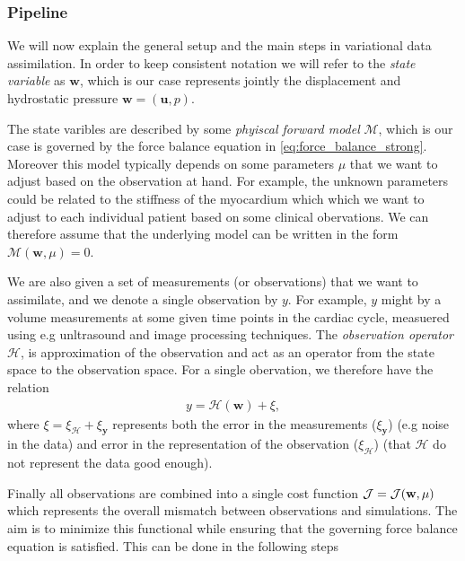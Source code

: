 \subsubsection{Pipeline}
\label{sec:data_assimilation_pipeline}

We will now explain the general setup and the main steps in variational data
assimilation. In order to keep consistent notation we will refer to
the \emph{state variable} as $\mathbf{w}$, which is our case
represents jointly the displacement and hydrostatic pressure
$\mathbf{w}=(\mathbf{u}, p)$.

The state varibles are described by some \emph{phyiscal forward
model} $\mathcal{M}$, which is our case is governed by the force balance
equation in \eqref{eq:force_balance_strong}. Moreover this model
typically depends on some parameters $\mu$ that we want to
adjust based on the observation at hand. For example, the unknown
parameters could be related to the stiffness of the myocardium which
which we want to adjust to each individual patient based on some
clinical obervations. We can therefore assume that the underlying
model can be written in the form $\mathcal{M}(\mathbf{w}, \mu) = 0$.

We are also given a set of measurements (or observations) that we want
to assimilate, and we denote a single observation by $y$.
For example, $y$ might by a volume measurements at some given time
points in the cardiac cycle, measuered using e.g unltrasound and image
processing techniques. The \emph{observation operator} $\mathcal{H}$,
is approximation of the observation and act as an operator from the
state space to the observation space. For a single obervation, we
therefore have the relation
\begin{align}
  y = \mathcal{H}(\mathbf{w}) + \xi, 
\end{align}
where $\xi = \xi_{\mathbf{\mathcal{H}}} + \xi_{\mathbf{y}}$ represents
both the error in the measurements ($\xi_{\mathbf{y}}$) (e.g
noise in the data) and error in the representation of the observation
($\xi_{\mathbf{\mathcal{H}}}$) (that $\mathcal{H}$ do not represent
the data good enough).

Finally all observations are combined into a single cost function
$\mathcal{J} = \mathcal{J}(\mathbf{w}, \mu)$ which represents the overall mismatch between
observations and simulations. The aim is to minimize this functional
while ensuring that the governing force balance equation is
satisfied. This can be done in the following steps

